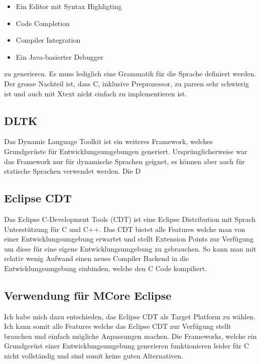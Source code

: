 \begin{itemize} 
	\item Ein Editor mit Syntax Highligting
	\item Code Completion
	\item Compiler Integration
	\item Ein Java-basierter Debugger
\end{itemize}

zu generieren. \cite{xtext} Es muss lediglich eine Grammatik für die Sprache definiert werden. Der grosse Nachteil ist, dass C, inklusive Preprozessor, zu parsen sehr schwierig ist und auch mit Xtext nicht einfach zu implementieren ist.

\subsection{DLTK}
Das Dynamic Language Toolkit ist ein weiteres Framework, welches Grundgerüste für Entwicklungsumgebungen generiert. Ursprünglicherweise war das Framework nur für dynamische Sprachen geignet, es können aber auch für statische Sprachen verwendet werden. Die D

\subsection{Eclipse CDT}
Das Eclipse C-Development Tools (CDT) ist eine Eclipse Distribution mit Sprach Unterstützung für C und C++. Das CDT bietet alle Features welche man von einer Entwicklungsumgebung erwartet und stellt Extension Points zur Verfügung um diese für eine eigene Entwicklungsumgebung zu gebrauchen. So kann man mit relativ wenig Aufwand einen neues Compiler Backend in die Entwicklungsumgebung einbinden, welche den C Code kompiliert.

\subsection{Verwendung für MCore Eclipse}
Ich habe mich dazu entschieden, das Eclipse CDT als Target Platform zu wählen. Ich kann somit alle Features welche das Eclipse CDT zur Verfügung stellt brauchen und einfach mögliche Anpassungen machen. Die Frameworks, welche ein Grundgerüst einer Entwicklungsumgebung generieren funktionieren leider für C nicht vollständig und sind somit keine guten Alternativen.
